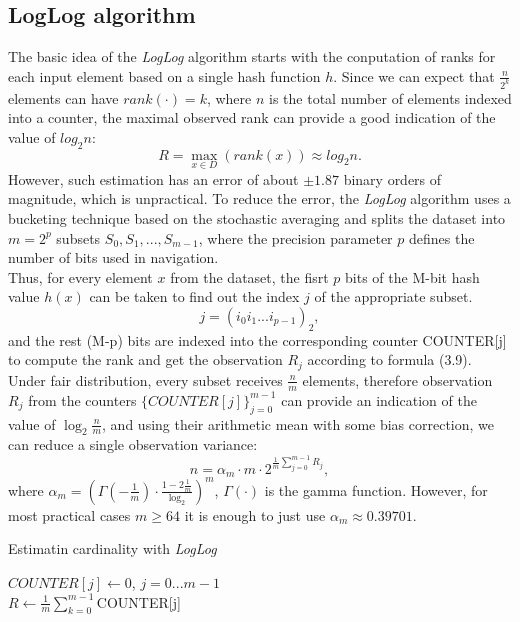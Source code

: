 \documentclass[a4paper,13pt]{article}
\theoremstyle{mytheor}
\begin{document}
\subsection*{LogLog algorithm}
The basic idea of the \textit{LogLog} algorithm starts with the conputation of
ranks for each input element based on a single hash function $h$. Since we
can expect that $\frac{n}{2^k}$ elements can have $rank(\cdot) = k$, where $n$ is the total
number of elements indexed into a counter, the maximal observed rank can provide a good
indication of the value of $log_2n$:
\[R = \underset{x \in D}{\max}\left(rank(x)\right) \approx log_2n.\]
\indent However, such estimation has an error of about $\pm1.87$ binary orders of
magnitude, which is unpractical. To reduce the error, the \textit{LogLog}
algorithm uses a bucketing technique based on the stochastic averaging
and splits the dataset into $m = 2^p$ subsets $S_0,S_1,...,S_{m-1}$, where
the precision parameter $p$ defines the number of bits used in navigation.\\
\indent Thus, for every element $x$ from the dataset, the fisrt $p$ bits of the M-bit
hash value $h(x)$ can be taken to find out the index $j$ of the appropriate subset.
\[j = \left(i_0i_1...i_{p-1}\right)_2,\]
and the rest (M-p) bits are indexed into the corresponding counter
COUNTER[j] to compute the rank and get the observation $R_j$ according
to formula (3.9).\\
\indent Under fair distribution, every subset receives $\frac{n}{m}$ elements, therefore
observation $R_j$ from the counters $\{COUNTER[j]\}_{j=0}^{m-1}$ can provide
an indication of the value of $\log_2{\frac{n}{m}}$, and using their arithmetic mean
with some bias correction, we can reduce a single observation variance:
\[
    n = \alpha_m \cdot m \cdot 2 ^{\frac{1}{m}\sum\limits_{j=0}^{m-1}R_j},
\]
where $\alpha_m = \left(\Gamma\left(-\frac{1}{m}\right)\cdot \frac{1-2\frac{1}{m}}{\log_2}\right)^m$, $\Gamma(\cdot)$ is the gamma function. However,
for most practical cases $m \ge 64$ it is enough to just use $\alpha_m \approx 0.39701$.\\

\begin{algorithm}[H]
    \vspace{0.25cm}
    \DontPrintSemicolon
    \LinesNumberedHidden
    \caption[]{Estimatin cardinality with \textit{LogLog}}
    $COUNTER[j] \gets $0, $j = 0...m - 1$\\
    $R \gets \frac{1}{m} \sum\limits_{k=0}^{m-1}$COUNTER[j] \\
    \vspace{0.25cm}
\end{algorithm}
\vspace{0.25cm}
\end{document}
